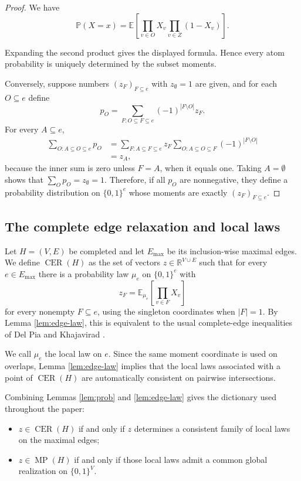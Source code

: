 \documentclass[11pt]{article}
\theoremstyle{definition}
\theoremstyle{remark}
\newcommand{\MP}{\operatorname{MP}}
\newcommand{\CER}{\operatorname{CER}}
\newcommand{\E}{\mathbb{E}}
\newcommand{\Prob}{\mathbb{P}}
\begin{document}
\begin{editedaiblock}
\begin{proof}
We have
\[
\Prob(X=x)=\E\left[\prod_{v\in O}X_v\prod_{v\in Z}(1-X_v)\right].
\]


Expanding the second product gives the displayed formula. Hence every atom probability is uniquely determined by the subset moments.

Conversely, suppose numbers $(z_F)_{F\subseteq e}$ with $z_\emptyset=1$ are given, and for each $O\subseteq e$ define
\[
p_O=\sum_{F:O\subseteq F\subseteq e}
(-1)^{|F\setminus O|}z_F.
\]
For every $A\subseteq e$,
\[
\begin{aligned}
\sum_{O:A\subseteq O\subseteq e}p_O
&=
\sum_{F:A\subseteq F\subseteq e}
z_F
\sum_{O:A\subseteq O\subseteq F}
(-1)^{|F\setminus O|}\\
&=z_A,
\end{aligned}
\]
because the inner sum is zero unless $F=A$, when it equals one.
Taking $A=\emptyset$ shows that $\sum_O p_O=z_\emptyset=1$. Therefore, if all $p_O$ are nonnegative, they define a probability distribution on $\{0,1\}^e$ whose moments are exactly $(z_F)_{F\subseteq e}$.

\end{proof}

\subsection{The complete edge relaxation and local laws}

Let $H=(V,E)$ be completed and let $E_{\max}$ be its inclusion-wise maximal edges. We define $\CER(H)$ as the set of vectors $z\in\mathbb{R}^{V\cup E}$ such that for every $e\in E_{\max}$ there is a probability law $\mu_e$ on $\{0,1\}^e$ with
\[
z_F=\E_{\mu_e}\left[\prod_{v\in F}X_v\right]
\]
for every nonempty $F\subseteq e$, using the singleton coordinates when $|F|=1$. By Lemma \ref{lem:edge-law}, this is equivalent to the usual complete-edge inequalities of Del Pia and Khajavirad \cite{delpia2017polyhedral,delpia2026cer}.

We call $\mu_e$ the local law on $e$. Since the same moment coordinate is used on overlaps, Lemma \ref{lem:edge-law} implies that the local laws associated with a point of $\CER(H)$ are automatically consistent on pairwise intersections.

Combining Lemmas \ref{lem:prob} and \ref{lem:edge-law} gives the dictionary used throughout the paper:
\begin{itemize}
\item $z\in\CER(H)$ if and only if $z$ determines a consistent family of local laws on the maximal edges;
\item $z\in\MP(H)$ if and only if those local laws admit a common global realization on $\{0,1\}^V$.
\end{itemize}


\end{editedaiblock}
\end{document}
